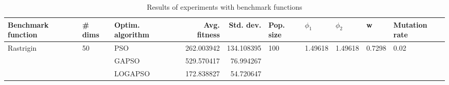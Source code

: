 \begin{table}
\centering
\caption{Results of experiments with benchmark functions}
\begin{tabular}{lllrrlllll}
\toprule
        Benchmark function &             \# dims & Optim. algorithm &  Avg. fitness &  Std. dev. &            Pop. size &               $\phi_{1}$ &               $\phi_{2}$ &                       w &         Mutation rate \\
\midrule
\multirow{3}{*}{Rastrigin} & \multirow{3}{*}{50} &              PSO &    262.003942 & 134.108395 & \multirow{3}{*}{100} & \multirow{3}{*}{1.49618} & \multirow{3}{*}{1.49618} & \multirow{3}{*}{0.7298} & \multirow{3}{*}{0.02} \\
                           &                     &            GAPSO &    529.570417 &  76.994267 &                      &                          &                          &                         &                       \\
                           &                     &          LOGAPSO &    172.838827 &  54.720647 &                      &                          &                          &                         &                       \\
\bottomrule
\end{tabular}
\end{table}

